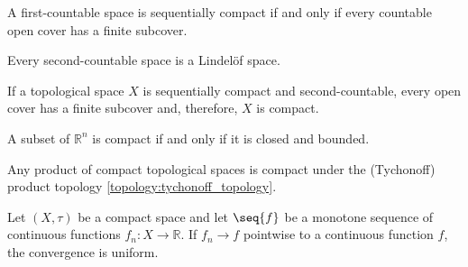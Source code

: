 
    \begin{property}
        A first-countable space is sequentially compact if and only if every countable open cover has a finite subcover.
    \end{property}

    \begin{property}
        Every second-countable space is a Lindel\"of space.
    \end{property}


    \begin{theorem}
        If a topological space $X$ is sequentially compact and second-countable, every open cover has a finite subcover and, therefore, $X$ is compact.
    \end{theorem}
    \begin{result}
        A subset of $\mathbb{R}^n$ is compact if and only if it is closed and bounded.
    \end{result}

    \begin{theorem}
        Any product of compact topological spaces is compact under the (Tychonoff) product topology \ref{topology:tychonoff_topology}.
    \end{theorem}



    \begin{theorem}[Dini]
        Let $(X,\tau)$ be a compact space and let $\seq{f}$ be a monotone sequence of continuous functions $f_n:X\rightarrow\mathbb{R}$. If $f_n\longrightarrow f$ pointwise to a continuous function $f$, the convergence is uniform.
    \end{theorem}

